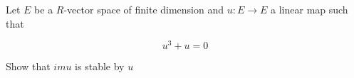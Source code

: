 Let $E$ be a $R$-vector space of finite dimension and $u: E \to E$ a linear map such that

\[u^3 + u = 0\]

Show that $im u$ is stable by $u$